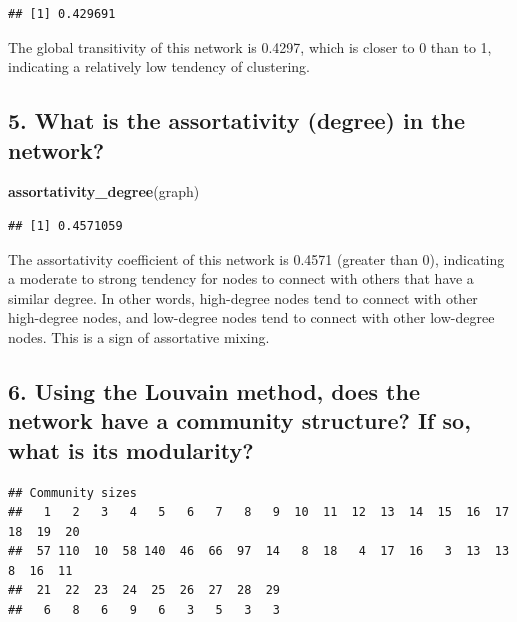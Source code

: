 \documentclass[
]{article}
\newenvironment{Shaded}{\begin{snugshade}}{\end{snugshade}}
\newcommand{\AttributeTok}[1]{\textcolor[rgb]{0.13,0.29,0.53}{#1}}
\newcommand{\FunctionTok}[1]{\textcolor[rgb]{0.13,0.29,0.53}{\textbf{#1}}}
\newcommand{\NormalTok}[1]{#1}
\newcommand{\OtherTok}[1]{\textcolor[rgb]{0.56,0.35,0.01}{#1}}
\newcommand{\SpecialCharTok}[1]{\textcolor[rgb]{0.81,0.36,0.00}{\textbf{#1}}}
\begin{document}
\begin{verbatim}
## [1] 0.429691
\end{verbatim}

The global transitivity of this network is 0.4297, which is closer to 0
than to 1, indicating a relatively low tendency of clustering.

\subsection{5. What is the assortativity (degree) in the
network?}\label{what-is-the-assortativity-degree-in-the-network}

\begin{Shaded}
\begin{Highlighting}[]
\FunctionTok{assortativity\_degree}\NormalTok{(graph)}
\end{Highlighting}
\end{Shaded}

\begin{verbatim}
## [1] 0.4571059
\end{verbatim}

The assortativity coefficient of this network is 0.4571 (greater than
0), indicating a moderate to strong tendency for nodes to connect with
others that have a similar degree. In other words, high-degree nodes
tend to connect with other high-degree nodes, and low-degree nodes tend
to connect with other low-degree nodes. This is a sign of assortative
mixing.

\subsection{6. Using the Louvain method, does the network have a
community structure? If so, what is its
modularity?}\label{using-the-louvain-method-does-the-network-have-a-community-structure-if-so-what-is-its-modularity}

\begin{Shaded}
\end{Shaded}

\begin{verbatim}
## Community sizes
##   1   2   3   4   5   6   7   8   9  10  11  12  13  14  15  16  17  18  19  20 
##  57 110  10  58 140  46  66  97  14   8  18   4  17  16   3  13  13   8  16  11 
##  21  22  23  24  25  26  27  28  29 
##   6   8   6   9   6   3   5   3   3
\end{verbatim}
\end{document}
